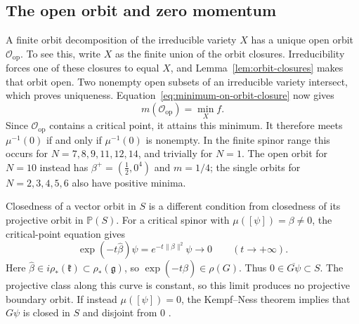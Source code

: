 \documentclass{article}
\theoremstyle{definition}
\theoremstyle{remark}
\newcommand{\PP}{\mathbb P}
\newcommand{\norm}[1]{\lVert #1\rVert}
\begin{document}

\subsection{The open orbit and zero momentum}

A finite orbit decomposition of the irreducible variety $X$ has a
unique open orbit $\mathcal O_{\mathrm{op}}$. To see this, write $X$
as the finite union of the orbit closures. Irreducibility forces one
of these closures to equal $X$, and Lemma~\ref{lem:orbit-closures}
makes that orbit open. Two nonempty open subsets of an irreducible
variety intersect, which proves uniqueness. Equation~\eqref{eq:minimum-on-orbit-closure}
now gives
\begin{equation}
 m(\mathcal O_{\mathrm{op}})=\min_X f.
\end{equation}
Since $\mathcal O_{\mathrm{op}}$ contains a critical point, it attains
this minimum. It therefore meets $\mu^{-1}(0)$ if and only if
$\mu^{-1}(0)$ is nonempty. In the finite spinor range this occurs for
$N=7,8,9,11,12,14$, and trivially for $N=1$. The open orbit for
$N=10$ instead has $\beta^+=(\tfrac12,0^4)$ and $m=1/4$;
the single orbits for $N=2,3,4,5,6$ also have positive minima.

Closedness of a vector orbit in $S$ is a different condition from
closedness of its projective orbit in $\PP(S)$. For a critical spinor
with $\mu([\psi])=\beta\ne0$, the critical-point equation gives
\begin{equation}
 \exp(-t\widehat\beta)\psi
       =e^{-t\norm\beta^2}\psi\longrightarrow0
       \qquad(t\longrightarrow+\infty).
\end{equation}
Here $\widehat\beta\in i\rho_*(\mathfrak k)\subset\rho_*(\mathfrak g)$,
so $\exp(-t\widehat\beta)\in\rho(G)$.
Thus $0\in\overline{G\psi}\subset S$. The projective class along
this curve is constant, so this limit produces no projective boundary
orbit. If instead $\mu([\psi])=0$, the Kempf--Ness theorem implies
that $G\psi$ is closed in $S$ and disjoint from $0$
\cite{KempfNess1979}.
\end{document}

